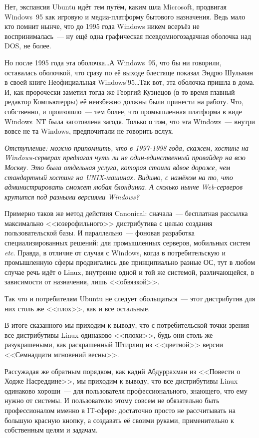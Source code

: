 Нет, экспансия Ubuntu идёт тем путём, каким шла Microsoft, продвигая Windows~95 как игровую и медиа-платформу бытового назначения. Ведь мало кто помнит нынче, что до 1995 года Windows никем всеръёз не воспринималась~--- ну ещё одна графическая псевдомногозадачная оболочка над DOS, не более.

Но после 1995 года эта оболочка\dots А Windows~95, что бы ни говорили, оставалась оболочкой, что сразу по её выходе блестяще показал Эндрю Шульман в своей книге Неофициальная Windows'95\dots Так вот, эта оболочка пришла в дома. И, как пророчески заметил тогда же Георгий Кузнецов (в то время главный редактор Компьютерры) её неизбежно должны были принести на работу. Что, собственно, и произошло~--- тем более, что промышленная платформа в виде Windows~NT была заготовлена загодя. Только о том, что эта Windows~--- внутри вовсе не та Windows, предпочитали не говорить вслух.

\textsl{Отступление: можно припомнить, что в 1997-1998 года, скажем, хостинг на Windows-серверах предлагал чуть ли не один-единственный провайдер на всю Москву. Это была отдельная услуга, которая стоила вдвое дороже, чем стандартный хостинг на UNIX-машинах. Видимо, с намёком на то, что администрировать сможет любая блондинка. А сколько нынче Web-серверов крутится под разными версиями Windows?}\medskip

Примерно таков же метод действия Canonical: сначала~--- бесплатная рассылка максимально <<юзерофильного>> дистрибутива с целью создания пользовательской базы. И параллельно~--- фоновая разработка специализированных решений: для промышленных серверов, мобильных систем \textit{etc}. Правда, в отличие от случая с Windows, когда в потребительскую и промышленную сферы продвигались две принципиально разные ОС, тут в любом случае речь идёт о Linux, внутренне одной и той же системой, различающейся, в зависимости от назначения, лишь <<обвязкой>>.

Так что и потребителям Ubuntu не следует обольщаться~--- этот дистрибутив для них столь же <<плох>>, как и все остальные.

В итоге сказанного мы приходим к выводу, что с потребительской точки зрения все дистрибутивы Linux одинаково <<плохи>>, будь они столь же разукрашеными, как раскрашенный Штирлиц из <<цветной>> версии <<Семнадцати мгновений весны>>.

Рассужадая же обратным порядком, как кадий Абдуррахман из <<Повести о Ходже Насреддине>>, мы приходим к выводу, что все дистрибутивы Linux одинаково хороши~--- для пользователя профессионального, знающего, что ему нужно от системы. И пользователю этому совсем не обязательно быть профессионалом именно в IT-сфере: достаточно просто не рассчитывать на большую красную кнопку, а создавать её своими руками, применительно к собственным целям и задачам.

